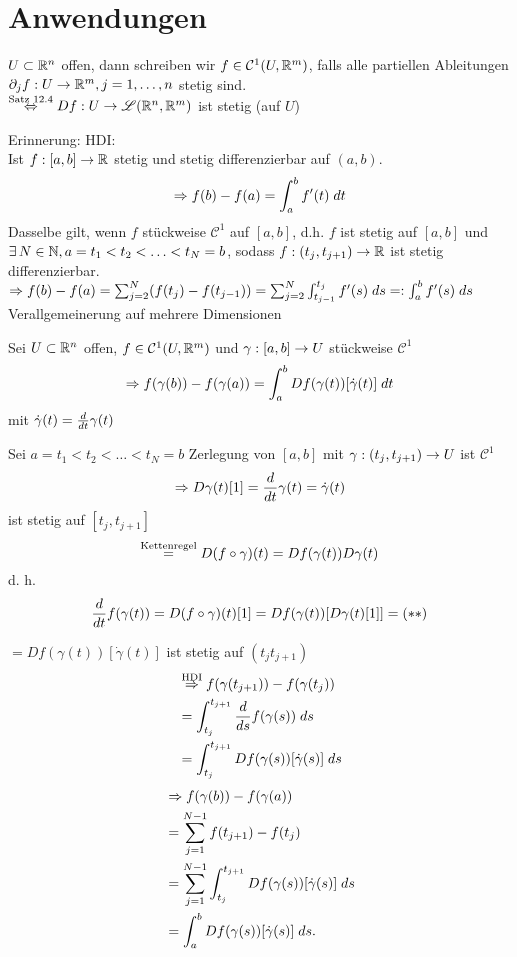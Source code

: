 \documentclass[../ana2.tex]{subfiles}
\begin{document}
\setcounter{section}{12}
\section{Anwendungen}
\begin{notation}
    \( U \subset \R^n \) offen, 
    dann schreiben wir \(f \in \mathcal{C}^1(U, \R^m)\), 
    falls alle partiellen Ableitungen \( \abb{\partial_jf}{U}{\R^m}, 
    j = 1,\ldots, n \) stetig sind.\\
    \( \oversett{Satz 12.4}{\Leftrightarrow} 
    \abb{Df}{U}{\mathscr{L}(\R^n, \R^m)} \) 
    ist stetig (auf \(U\))
\end{notation}
Erinnerung: HDI: \\
Ist \( \abb{f}{[a,b]}{\R} \) stetig und stetig differenzierbar
auf \((a,b)\).
\[ \Rightarrow f(b)-f(a) = \integralx{f'(t)}{a}{b}{t} \]
Dasselbe gilt, wenn \(f\) stückweise \(\mathcal{C}^1\)
auf \([a,b]\), d.h. \(f\) ist stetig auf \([a,b]\) und
\( \exists N \in \N, a = t_1 < t_2 < \ldots < t_N = b \),
sodass \( \abb{f}{(t_j, t_{j+1})}{\R} \) ist stetig 
differenzierbar.\\
\( \Rightarrow f(b)- f(a) = \sum_{j=2}^N (f(t_j) - f(t_{j-1}))
= \sum_{j=2}^N \integralx{f'(s)}{t_{j-1}}{t_j}{s} 
=: \integralx{f'(s)}{a}{b}{s} \)\\
Verallgemeinerung auf mehrere Dimensionen
\begin{lem}
    Sei \(U \subset \R^n\) offen, \( f \in \mathcal{C}^1(U, \R^m) \) 
    und \( \abb{\gamma}{[a,b]}{U} \) stückweise \(\mathcal{C}^1\)
    \[ \Rightarrow f(\gamma(b)) - f(\gamma(a)) 
    = \integralx{Df(\gamma(t))[\dot{\gamma}(t)]}{a}{b}{t} \]
    mit \(\dot{\gamma}(t) = \ddx{t} \gamma(t)\)
\end{lem}
\begin{bew}
    Sei \( a = t_1 < t_2 < \dots < t_N = b \) Zerlegung von 
    \( [a,b] \) mit \( \abb{\gamma}{(t_j, t_{j+1})}{U} \) 
    ist \( \mathcal{C}^1 \)
    \[ \Rightarrow D \gamma(t)[1] = \ddx{t} \gamma(t) 
    = \dot{\gamma}(t) \]
    ist stetig auf \( [t_j, t_{j+1}] \)
    \[ \oversett{Kettenregel}{=} D(f\circ \gamma)(t)
    = Df(\gamma(t))D\gamma(t) \]
    d. h. 
    \[ \ddx{t} f(\gamma(t)) = D(f\circ\gamma)(t)[1] 
    = Df(\gamma(t))[D\gamma(t)[1]] = (**) \] 

    \( = Df(\gamma(t))[\dot{\gamma}(t)] \) ist stetig auf 
    \( (t_j t_{j+1}) \)
    \begin{align*}
        &\oversett{HDI}{\Rightarrow} f(\gamma(t_{j+1})) 
        - f(\gamma(t_j)) \\
        &= \integralx{\ddx{s}f(\gamma(s))}{t_j}{t_{j+1}}{s} \\
        &= \integralx{D f(\gamma(s))
        [\dot{\gamma}(s)]}{t_j}{t_{j+1}}{s} 
    \end{align*}
    \begin{align*}
        &\Rightarrow f(\gamma(b)) - f(\gamma(a)) \\
        &= \sum_{j=1}^{N-1} f(t_{j+1}) - f(t_j) \\
        &= \sum_{j=1}^{N-1} \integralx{Df(\gamma(s))[\dot{\gamma}(s)]}{t_j}{t_{j+1}}{s} \\
        &= \integralx{Df(\gamma(s))[\dot{\gamma}(s)]}{a}{b}{s}.
    \end{align*}
\end{bew}
\end{document}

